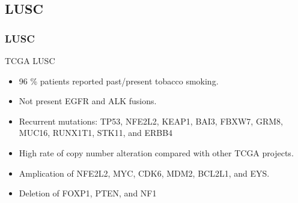 \documentclass{beamer}
\begin{document}
    \subsection{LUSC}
    \begin{frame}
        \frametitle{LUSC}

        TCGA LUSC \cite{LUSC-1}
        \begin{itemize}
            \item 96 \% patients reported past/present tobacco smoking.
            \item Not present EGFR and ALK fusions.
            \item Recurrent mutations: TP53, NFE2L2, KEAP1, BAI3, FBXW7, GRM8, MUC16, RUNX1T1, STK11, and ERBB4
            \item High rate of copy number alteration compared with other TCGA projects.
            \item Amplication of NFE2L2, MYC, CDK6, MDM2, BCL2L1, and EYS.
            \item Deletion of FOXP1, PTEN, and NF1
        \end{itemize}
    \end{frame}
\end{document}
